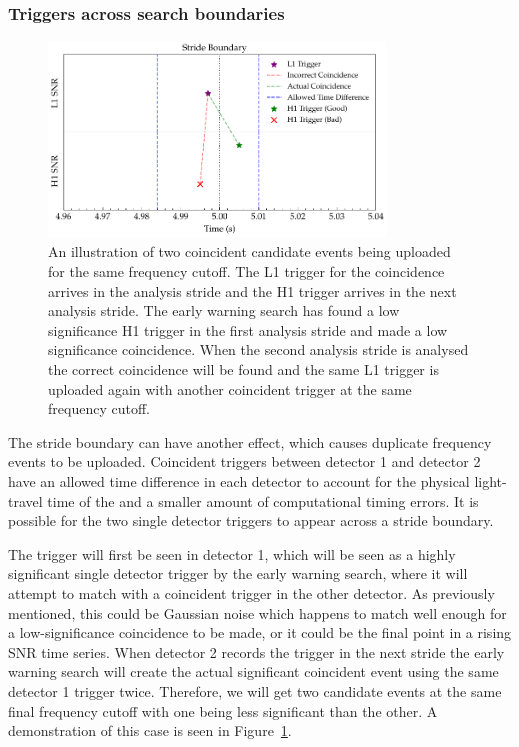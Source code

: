 \subsubsection{\label{6:sec:trigs-across-bounds}Triggers across search boundaries}
%
\begin{figure}
       \centering
    \includegraphics[width=0.8\textwidth]{images/6_earlywarning/identified-problems/trigs_across_bounds.pdf}
    \caption{An illustration of two coincident candidate events being uploaded for the same frequency cutoff. The L1 trigger for the coincidence arrives in the analysis stride and the H1 trigger arrives in the next analysis stride. The early warning search has found a low significance H1 trigger in the first analysis stride and made a low significance coincidence. When the second analysis stride is analysed the correct coincidence will be found and the same L1 trigger is uploaded again with another coincident trigger at the same frequency cutoff.}
    \label{6:fig:triggers_across_boundaries}
\end{figure}
%
The stride boundary can have another effect, which causes duplicate frequency events to be uploaded. Coincident triggers between detector 1 and detector 2 have an allowed time difference in each detector to account for the physical light-travel time of the \gw and a smaller amount of computational timing errors. It is possible for the two single detector triggers to appear across a stride boundary.

The trigger will first be seen in detector 1, which will be seen as a highly significant single detector trigger by the early warning search, where it will attempt to match with a coincident trigger in the other detector. As previously mentioned, this could be Gaussian noise which happens to match well enough for a low-significance coincidence to be made, or it could be the final point in a rising SNR time series. When detector 2 records the trigger in the next stride the early warning search will create the actual significant coincident event using the same detector 1 trigger twice. Therefore, we will get two candidate events at the same final frequency cutoff with one being less significant than the other. A demonstration of this case is seen in Figure~\ref{6:fig:triggers_across_boundaries}.

